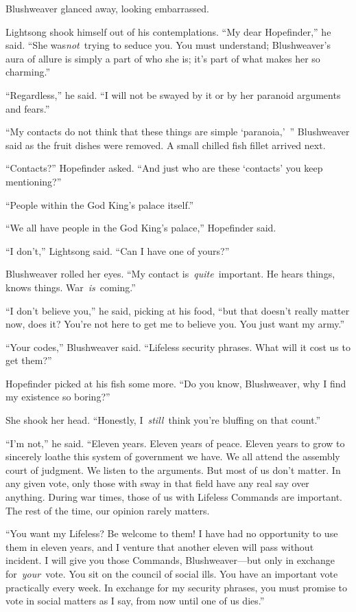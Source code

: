 Blushweaver glanced away, looking embarrassed.

Lightsong shook himself out of his contemplations. “My dear Hopefinder,” he said. “She was\textit{not}~trying to seduce you. You must understand; Blushweaver’s aura of allure is simply a part of who she is; it’s part of what makes her so charming.”

“Regardless,” he said. “I will not be swayed by it or by her paranoid arguments and fears.”

“My contacts do not think that these things are simple ‘paranoia,’~” Blushweaver said as the fruit dishes were removed. A small chilled fish fillet arrived next.

“Contacts?” Hopefinder asked. “And just who are these ‘contacts’ you keep mentioning?”

“People within the God King’s palace itself.”

“We all have people in the God King’s palace,” Hopefinder said.

“I don’t,” Lightsong said. “Can I have one of yours?”

Blushweaver rolled her eyes. “My contact is~\textit{quite}~important. He hears things, knows things. War~\textit{is}~coming.”

“I don’t believe you,” he said, picking at his food, “but that doesn’t really matter now, does it? You’re not here to get me to believe you. You just want my army.”

“Your codes,” Blushweaver said. “Lifeless security phrases. What will it cost us to get them?”

Hopefinder picked at his fish some more. “Do you know, Blushweaver, why I find my existence so boring?”

She shook her head. “Honestly, I~\textit{still}~think you’re bluffing on that count.”

“I’m not,” he said. “Eleven years. Eleven years of peace. Eleven years to grow to sincerely loathe this system of government we have. We all attend the assembly court of judgment. We listen to the arguments. But most of us don’t matter. In any given vote, only those with sway in that field have any real say over anything. During war times, those of us with Lifeless Commands are important. The rest of the time, our opinion rarely matters.

“You want my Lifeless? Be welcome to them! I have had no opportunity to use them in eleven years, and I venture that another eleven will pass without incident. I will give you those Commands, Blushweaver—but only in exchange for~\textit{your}~vote. You sit on the council of social ills. You have an important vote practically every week. In exchange for my security phrases, you must promise to vote in social matters as I say, from now until one of us dies.”

